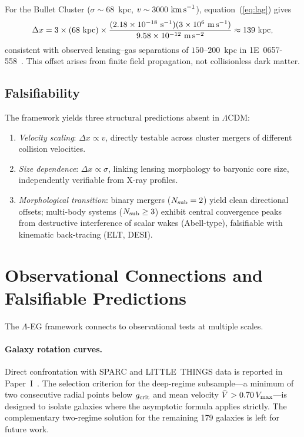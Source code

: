 \documentclass[11pt,a4paper]{article}
\begin{document}
For the Bullet Cluster ($\sigma\sim68$~kpc, $v\sim3000\ \text{km\,s}^{-1}$),
equation~(\ref{eq:lag}) gives
\begin{equation}
  \Delta x
  = 3\times(68\ \text{kpc})\times
  \frac{(2.18\times10^{-18}\ \text{s}^{-1})(3\times10^6\ \text{m\,s}^{-1})}
       {9.58\times10^{-12}\ \text{m\,s}^{-2}}
  \approx 139\ \text{kpc},
\end{equation}
consistent with observed lensing--gas separations of $150$--$200$~kpc in
1E~0657-558~\cite{Clowe2006}. This offset arises from finite field propagation,
not collisionless dark matter.

\subsection{Falsifiability}
\label{subsec:lensing_falsifiability}

The framework yields three structural predictions absent in $\Lambda$CDM:
\begin{enumerate}[label=(\roman*)]
\item \textit{Velocity scaling}: $\Delta x\propto v$, directly testable across
      cluster mergers of different collision velocities.
\item \textit{Size dependence}: $\Delta x\propto\sigma$, linking lensing morphology
      to baryonic core size, independently verifiable from X-ray profiles.
\item \textit{Morphological transition}: binary mergers ($N_{\rm sub}=2$) yield
      clean directional offsets; multi-body systems ($N_{\rm sub}\geq3$) exhibit central
      convergence peaks from destructive interference of scalar wakes (Abell-type),
      falsifiable with kinematic back-tracing (ELT, DESI).
\end{enumerate}

\section{Observational Connections and Falsifiable Predictions}
\label{sec:obs}

The $\Lambda$-EG framework connects to observational tests at multiple scales.

\paragraph{Galaxy rotation curves.}
Direct confrontation with SPARC and LITTLE~THINGS data is reported in Paper~I~\cite{PaperI}.
The selection criterion for the deep-regime subsample---a minimum of two consecutive
radial points below $g_{\rm crit}$ and mean velocity $\bar{V} > 0.70\,V_{\rm max}$---is
designed to isolate galaxies where the asymptotic formula applies strictly.
The complementary two-regime solution for the remaining 179 galaxies is left for future work.
\end{document}
